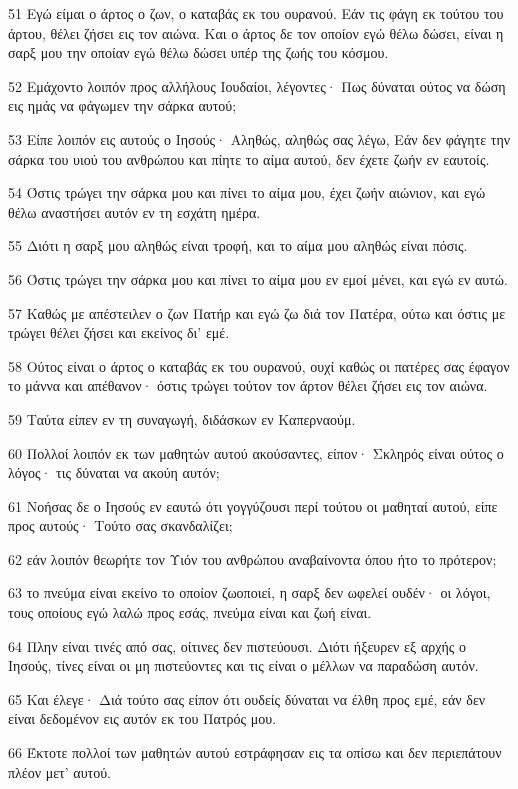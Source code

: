 \par 51 Εγώ είμαι ο άρτος ο ζων, ο καταβάς εκ του ουρανού. Εάν τις φάγη εκ τούτου του άρτου, θέλει ζήσει εις τον αιώνα. Και ο άρτος δε τον οποίον εγώ θέλω δώσει, είναι η σαρξ μου την οποίαν εγώ θέλω δώσει υπέρ της ζωής του κόσμου.
\par 52 Εμάχοντο λοιπόν προς αλλήλους Ιουδαίοι, λέγοντες· Πως δύναται ούτος να δώση εις ημάς να φάγωμεν την σάρκα αυτού;
\par 53 Είπε λοιπόν εις αυτούς ο Ιησούς· Αληθώς, αληθώς σας λέγω, Εάν δεν φάγητε την σάρκα του υιού του ανθρώπου και πίητε το αίμα αυτού, δεν έχετε ζωήν εν εαυτοίς.
\par 54 Όστις τρώγει την σάρκα μου και πίνει το αίμα μου, έχει ζωήν αιώνιον, και εγώ θέλω αναστήσει αυτόν εν τη εσχάτη ημέρα.
\par 55 Διότι η σαρξ μου αληθώς είναι τροφή, και το αίμα μου αληθώς είναι πόσις.
\par 56 Όστις τρώγει την σάρκα μου και πίνει το αίμα μου εν εμοί μένει, και εγώ εν αυτώ.
\par 57 Καθώς με απέστειλεν ο ζων Πατήρ και εγώ ζω διά τον Πατέρα, ούτω και όστις με τρώγει θέλει ζήσει και εκείνος δι' εμέ.
\par 58 Ούτος είναι ο άρτος ο καταβάς εκ του ουρανού, ουχί καθώς οι πατέρες σας έφαγον το μάννα και απέθανον· όστις τρώγει τούτον τον άρτον θέλει ζήσει εις τον αιώνα.
\par 59 Ταύτα είπεν εν τη συναγωγή, διδάσκων εν Καπερναούμ.
\par 60 Πολλοί λοιπόν εκ των μαθητών αυτού ακούσαντες, είπον· Σκληρός είναι ούτος ο λόγος· τις δύναται να ακούη αυτόν;
\par 61 Νοήσας δε ο Ιησούς εν εαυτώ ότι γογγύζουσι περί τούτου οι μαθηταί αυτού, είπε προς αυτούς· Τούτο σας σκανδαλίζει;
\par 62 εάν λοιπόν θεωρήτε τον Υιόν του ανθρώπου αναβαίνοντα όπου ήτο το πρότερον;
\par 63 το πνεύμα είναι εκείνο το οποίον ζωοποιεί, η σαρξ δεν ωφελεί ουδέν· οι λόγοι, τους οποίους εγώ λαλώ προς εσάς, πνεύμα είναι και ζωή είναι.
\par 64 Πλην είναι τινές από σας, οίτινες δεν πιστεύουσι. Διότι ήξευρεν εξ αρχής ο Ιησούς, τίνες είναι οι μη πιστεύοντες και τις είναι ο μέλλων να παραδώση αυτόν.
\par 65 Και έλεγε· Διά τούτο σας είπον ότι ουδείς δύναται να έλθη προς εμέ, εάν δεν είναι δεδομένον εις αυτόν εκ του Πατρός μου.
\par 66 Έκτοτε πολλοί των μαθητών αυτού εστράφησαν εις τα οπίσω και δεν περιεπάτουν πλέον μετ' αυτού.
